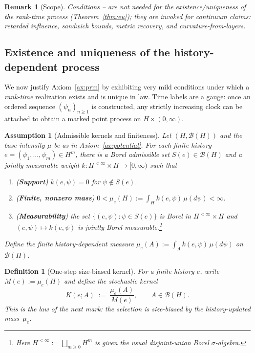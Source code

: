\documentclass[12pt,a4paper]{article}
\newtheorem{definition}{Definition}
\newtheorem{remark}{Remark}
\newtheorem{assumption}{Assumption}
\begin{document}
\begin{remark}[Scope]\label{rem:CL_scope}
Conditions -- are not needed for the \emph{existence/uniqueness} of the rank-time
process (Theorem~\ref{thm:eu}); they are invoked for continuum claims: retarded influence,
sandwich bounds, metric recovery, and curvature-from-layers.
\end{remark}


\subsection{Existence and uniqueness of the history-dependent process}\label{subsec:eu}

We now justify Axiom~\ref{ax:prm} by exhibiting very mild conditions under which
a \emph{rank-time} realization exists and is unique in law. Time labels are a gauge:
once an ordered sequence $(\psi_n)_{n\ge 1}$ is constructed, any strictly increasing
clock can be attached to obtain a marked point process on $H\times(0,\infty)$.

\begin{assumption}[Admissible kernels and finiteness]\label{ass:EU}
Let $(H,\mathcal B(H))$ and the base intensity $\mu$ be as in Axiom~\ref{ax:potential}.
For each finite history $e=(\psi_1,\dots,\psi_m)\in H^m$, there is a Borel \emph{admissible set}
$S(e)\in\mathcal B(H)$ and a jointly measurable weight $k:H^{<\infty}\times H\to[0,\infty)$ such that
\begin{enumerate}
    \item[(EU1)] (\textbf{Support}) $k(e,\psi)=0$ for $\psi\notin S(e)$.
    \item[(EU2)] (\textbf{Finite, nonzero mass}) $0<\mu_e(H):=\int_{H} k(e,\psi)\,\mu(d\psi)<\infty$.
    \item[(EU3)] (\textbf{Measurability}) the set $\{(e,\psi):\psi\in S(e)\}$ is Borel in $H^{<\infty}\times H$ and
    $(e,\psi)\mapsto k(e,\psi)$ is jointly Borel measurable.\footnote{Here $H^{<\infty}:=\bigsqcup_{m\ge 0} H^m$
    is given the usual disjoint-union Borel $\sigma$-algebra.}
\end{enumerate}
Define the finite \emph{history-dependent measure} $\mu_e(A):=\int_A k(e,\psi)\,\mu(d\psi)$ on $\mathcal B(H)$.
\end{assumption}

\begin{definition}[One-step size-biased kernel]\label{def:kernel}
For a finite history $e$, write $M(e):=\mu_e(H)$ and define the stochastic kernel
\begin{equation}
    K(e;A)\;:=\;\frac{\mu_e(A)}{M(e)},\qquad A\in\mathcal B(H).
\end{equation}
This is the law of the next mark: the selection is \emph{size-biased} by the history-updated mass~$\mu_e$.
\end{definition}
\end{document}
